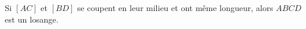 Si $[AC]$ et $[BD]$ se coupent en leur milieu et ont même longueur, alors $ABCD$ est un losange.

\begin{reponses}
\end{reponses}

